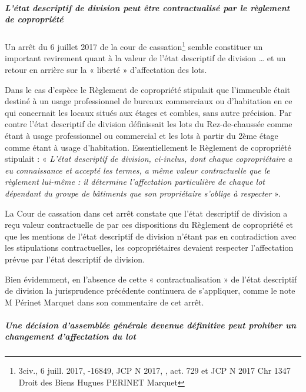 				\subparagraph{L’état descriptif de division peut être contractualisé par le règlement de copropriété}
				
				Un arrêt du 6 juillet 2017 de la cour de cassation\footnote{3\degres civ., 6 juill. 2017, -16849, JCP N 2017, , act. 729 et JCP N 2017 Chr 1347 Droit des Biens Hugues PERINET Marquet} semble constituer un important revirement quant à la valeur de l’état descriptif de division … et un retour en arrière sur la « liberté » d’affectation des lots.
				
				Dans le cas d’espèce le Règlement de copropriété stipulait que l'immeuble était destiné à un usage professionnel de bureaux commerciaux ou d'habitation en ce qui concernait les locaux situés aux étages et combles, sans autre précision. Par contre l’état descriptif de division définissait les lots du Rez-de-chaussée comme étant à usage professionnel ou commercial et les lots à partir du 2ème étage comme étant à usage d’habitation. Essentiellement le Règlement de copropriété stipulait : « {\itshape L'état descriptif de division, ci-inclus, dont chaque copropriétaire a eu connaissance et accepté les termes, a même valeur contractuelle que le règlement lui-même : il détermine l'affectation particulière de chaque lot dépendant du groupe de bâtiments que son propriétaire s'oblige à respecter} ».
				
				La Cour de cassation dans cet arrêt constate que l’état descriptif de division a reçu valeur contractuelle de par ces dispositions du Règlement de copropriété et que les mentions de l’état descriptif de division n’étant pas en contradiction avec les stipulations contractuelles, les copropriétaires devaient respecter l’affectation prévue par l’état descriptif de division.
				
				Bien évidemment, en l’absence de cette « contractualisation » de l’état descriptif de division la jurisprudence précédente continuera de s’appliquer, comme le note M Périnet Marquet dans son commentaire de cet arrêt.
				
				\subparagraph{Une décision d’assemblée générale devenue définitive peut prohiber un changement d’affectation du lot}
				

